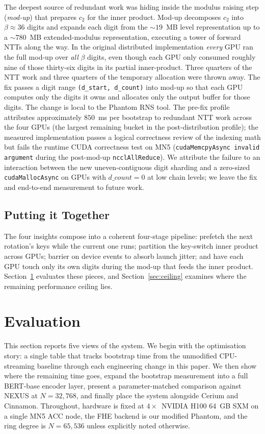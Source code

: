 \documentclass[conference]{IEEEtran}
\begin{document}
The deepest source of redundant work was hiding inside the modulus
raising step (\emph{mod-up}) that prepares $c_2$ for the inner
product. Mod-up decomposes $c_2$ into $\beta \approx 36$ digits and
expands each digit from the $\sim$$19$~MB level representation up to a
$\sim$$780$~MB extended-modulus representation, executing a tower of
forward NTTs along the way. In the original distributed implementation
\emph{every} GPU ran the full mod-up over \emph{all} $\beta$ digits,
even though each GPU only consumed roughly nine of those thirty-six
digits in its partial inner-product. Three quarters of the NTT work
and three quarters of the temporary allocation were thrown away. The
fix passes a digit range \texttt{(d\_start, d\_count)} into mod-up so
that each GPU computes only the digits it owns and allocates only the
output buffer for those digits. The change is local to the Phantom RNS
tool. The pre-fix profile attributes approximately $850$~ms per
bootstrap to redundant NTT work across the four GPUs (the largest
remaining bucket in the post-distribution profile); the measured
implementation passes a logical correctness review of the indexing math
but fails the runtime CUDA correctness test on MN5
(\texttt{cudaMemcpyAsync invalid argument} during the post-mod-up
\texttt{ncclAllReduce}). We attribute the failure to an interaction
between the new uneven-contiguous digit sharding and a zero-sized
\texttt{cudaMallocAsync} on GPUs with $d\_count{=}0$ at low chain
levels; we leave the fix and end-to-end measurement to future work.

\subsection{Putting it Together}

The four insights compose into a coherent four-stage pipeline: prefetch
the next rotation's keys while the current one runs; partition the
key-switch inner product across GPUs; barrier on device events to
absorb launch jitter; and have each GPU touch only its own digits
during the mod-up that feeds the inner product.
Section~\ref{sec:eval} evaluates these pieces, and
Section~\ref{sec:ceiling} examines where the remaining performance
ceiling lies.

\section{Evaluation}
\label{sec:eval}

This section reports five views of the system. We begin with the
optimisation story: a single table that tracks bootstrap time from the
unmodified CPU-streaming baseline through each engineering change in
this paper. We then show where the remaining time goes, expand the
bootstrap measurement into a full BERT-base encoder layer, present a
parameter-matched comparison against NEXUS at $N{=}32{,}768$, and
finally place the system alongside Cerium and Cinnamon. Throughout,
hardware is fixed at $4\times$~NVIDIA H100 64~GB SXM on a single MN5
ACC node, the FHE backend is our modified Phantom, and the ring degree
is $N{=}65{,}536$ unless explicitly noted otherwise.
\end{document}
